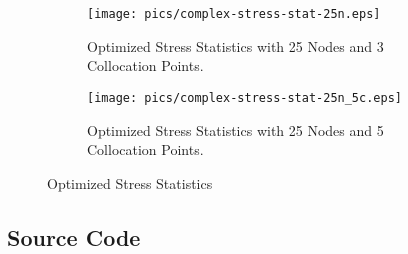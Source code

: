 \documentclass{article}
\begin{document}
\begin{figure}

\begin{subfigure}{0.49\textwidth}
\texttt{[image: pics/complex-stress-stat-25n.eps]} 
\caption{Optimized Stress Statistics with 25 Nodes and 3 Collocation Points.}
\end{subfigure}

\begin{subfigure}{0.49\textwidth}
\texttt{[image: pics/complex-stress-stat-25n\_5c.eps]}
\caption{Optimized Stress Statistics with 25 Nodes and 5 Collocation Points.}
\end{subfigure}

\caption{Optimized Stress Statistics}
\label{fig:optstats}
\end{figure}

 


\onecolumn
\subsection{Source Code}


\end{document}
